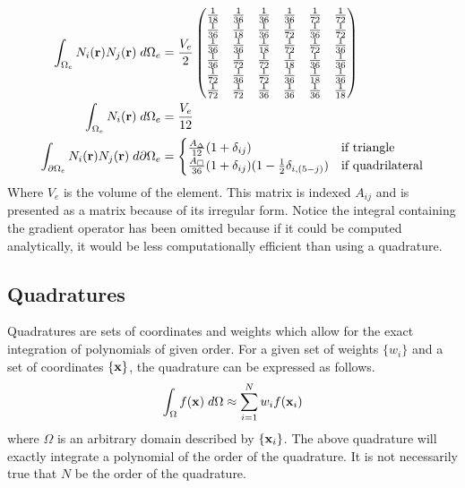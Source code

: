       \begin{align}
        \int_{\Omega_e} N_i(\mathbf{r}) N_j(\mathbf{r}) \;d\Omega_e &= 
          \frac{V_e}{2}
          \begin{pmatrix}
            \frac{1}{18} & \frac{1}{36} & \frac{1}{36} & \frac{1}{36} & 
              \frac{1}{72} & \frac{1}{72} \\
            \frac{1}{36} & \frac{1}{18} & \frac{1}{36} & \frac{1}{72} & 
              \frac{1}{36} & \frac{1}{72} \\
            \frac{1}{36} & \frac{1}{36} & \frac{1}{18} & \frac{1}{72} & 
              \frac{1}{72} & \frac{1}{36} \\
            \frac{1}{36} & \frac{1}{72} & \frac{1}{72} & \frac{1}{18} & 
              \frac{1}{36} & \frac{1}{36} \\
            \frac{1}{72} & \frac{1}{36} & \frac{1}{72} & \frac{1}{36} & 
              \frac{1}{18} & \frac{1}{36} \\
            \frac{1}{72} & \frac{1}{72} & \frac{1}{36} & \frac{1}{36} & 
              \frac{1}{36} & \frac{1}{18} 
          \end{pmatrix} \\
        \int_{\Omega_e} N_i(\mathbf{r}) \;d\Omega_e &= \frac{V_e}{12} \\
        \int_{\partial \Omega_e} N_i(\mathbf{r}) 
          N_j(\mathbf{r}) \;d\partial\Omega_e &= 
          \begin{cases}
            \frac{A_{\Delta}}{12}(1+\delta_{ij}) & \text{if triangle} \\
            \frac{A_{\Box}}{36}(1+\delta_{ij})(1-\frac{1}{2} \delta_{i,(5-j)}) &
              \text{if quadrilateral}
          \end{cases}
      \end{align}
      Where $V_e$ is the volume of the element. This matrix is indexed $A_{ij}$
      and is presented as a matrix because of its irregular form. Notice the 
      integral containing the gradient operator has been omitted because if 
      it could be computed analytically, it would be less computationally 
      efficient than using a quadrature.
      
  \subsection{Quadratures}
    \label{sec:quadratures}
    Quadratures are sets of coordinates and weights which allow for the exact 
    integration of polynomials of given order. For a given set of weights 
    $\{w_i\}$ and a set of coordinates $\{\mathbf{x}\}$, the quadrature can be 
    expressed as follows.
    \begin{equation}
      \int_{\Omega} f(\mathbf{x}) \;d\Omega \approx \sum_{i=1}^{N} w_i f(\mathbf{x}_i)
    \end{equation}
    where $\Omega$ is an arbitrary domain described by $\{\mathbf{x}_i\}$. The above
    quadrature will exactly integrate a polynomial of the order of the 
    quadrature. It is not necessarily true that $N$ be the order of the 
    quadrature.
    
